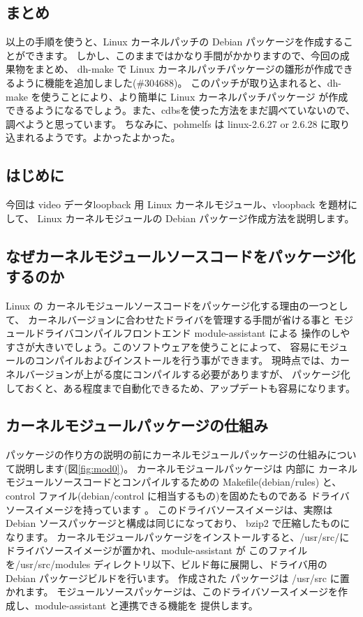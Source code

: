 \documentclass[mingoth,a4paper]{jsarticle}
\begin{document}
\subsection{まとめ}
以上の手順を使うと、Linux カーネルパッチの Debian パッケージを作成することができます。
しかし、このままではかなり手間がかかりますので、今回の成果物をまとめ、
dh-make で Linux カーネルパッチパッケージの雛形が作成できるように機能を追加しました(\#304688)。
このパッチが取り込まれると、dh-make を使うことにより、より簡単に Linux カーネルパッチパッケージ
が作成できるようになるでしょう。また、cdbsを使った方法をまだ調べていないので、調べようと思っています。
ちなみに、pohmelfs は linux-2.6.27 or 2.6.28 に取り込まれるようです。よかったよかった。

\label{sec:kmod}

\subsection{はじめに}
今回は video データloopback 用 Linux カーネルモジュール、vloopback を題材にして、
Linux カーネルモジュールの Debian パッケージ作成方法を説明します。

\subsection{なぜカーネルモジュールソースコードをパッケージ化するのか}
Linux の カーネルモジュールソースコードをパッケージ化する理由の一つとして、
カーネルバージョンに合わせたドライバを管理する手間が省ける事と
モジュールドライバコンパイルフロントエンド module-assistant 
による 操作のしやすさが大きいでしょう。このソフトウェアを使うことによって、
容易にモジュールのコンパイルおよびインストールを行う事ができます。
現時点では、カーネルバージョンが上がる度にコンパイルする必要がありますが、
パッケージ化しておくと、ある程度まで自動化できるため、アップデートも容易になります。

\subsection{カーネルモジュールパッケージの仕組み}
パッケージの作り方の説明の前にカーネルモジュールパッケージの仕組みについて説明します(図\ref{fig:mod0})。
カーネルモジュールパッケージは 内部に カーネルモジュールソースコードとコンパイルするための Makefile(debian/rules)
と、control ファイル(debian/control に相当するもの)を固めたものである ドライバソースイメージを持っています 。
このドライバソースイメージは、実際は Debian ソースパッケージと構成は同じになっており、 bzip2 で圧縮したものになります。 
カーネルモジュールパッケージをインストールすると、/usr/src/に ドライバソースイメージが置かれ、module-assistant が
このファイルを/usr/src/modules ディレクトリ以下、ビルド毎に展開し、ドライバ用の Debian パッケージビルドを行います。
作成された パッケージは /usr/src に置かれます。
モジュールソースパッケージは、このドライバソースイメージを作成し、module-assistant と連携できる機能を
提供します。
\end{document}
